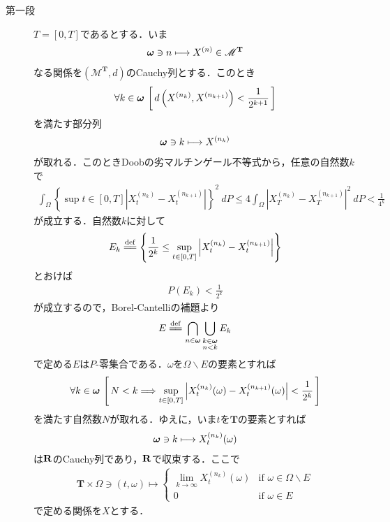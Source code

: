 	\begin{sketch}\mbox{}
		\begin{description}
			\item[第一段] $T = [0,T]$であるとする．いま
				\begin{align}
					{\boldsymbol \omega} \ni n \longmapsto X^{(n)} \in \mathscr{M}^{\mathbf{T}}
				\end{align}
				なる関係を$\left(\mathscr{M}^{\mathbf{T}},d\right)$のCauchy列とする．このとき
				\begin{align}
					\forall k \in {\boldsymbol \omega}\, \left[\, d\left( X^{(n_k)},X^{(n_{k+1})} \right) < \frac{1}{2^{k+1}}\, \right]
				\end{align}
				を満たす部分列
				\begin{align}
					{\boldsymbol \omega} \ni k \longmapsto X^{(n_k)}
				\end{align}
				が取れる．このときDoobの劣マルチンゲール不等式から，任意の自然数$k$で
				\begin{align}
					\int_\Omega \left\{ \sup{t \in [0,T]}{\left|X_t^{(n_k)} - X_t^{(n_{k+1})}\right|} \right\}^2\ dP
					\leq 4 \int_\Omega \left|X_T^{(n_k)} - X_T^{(n_{k+1})}\right|^2\ dP
					< \frac{1}{4^k}
					\label{fom:thm_pseudo_metric_on_square_integrable_martingales_2}
				\end{align}
				が成立する．自然数$k$に対して
				\begin{align}
					E_k \defeq \left\{ \frac{1}{2^k} \leq \sup{t \in [0,T]}{\left|X_t^{(n_k)} - X_t^{(n_{k+1})}\right|} \right\}
				\end{align}
				とおけば
				\begin{align}
					P(E_k) < \frac{1}{2^k}
				\end{align}
				が成立するので，Borel-Cantelliの補題より
				\begin{align}
					E \defeq \bigcap_{n \in \Natural} \bigcup_{\substack{k \in \Natural \\ n < k}} E_k
				\end{align}
				で定める$E$は$P$-零集合である．$\omega$を$\Omega \backslash E$の要素とすれば
				\begin{align}
					\forall k \in {\boldsymbol \omega}\,
					\left[\, N < k \Longrightarrow \operatorname*{sup}_{t \in [0,T]} \left|X_t^{(n_k)}(\omega) - X_t^{(n_{k+1})}(\omega)\right| < \frac{1}{2^k}\, \right]
					\label{fom:thm_pseudo_metric_on_square_integrable_martingales_1}
				\end{align}
				を満たす自然数$N$が取れる．ゆえに，いま$t$を$\mathbf{T}$の要素とすれば
				\begin{align}
					{\boldsymbol \omega} \ni k \longmapsto X_t^{(n_k)}(\omega)
				\end{align}
				は$\mathbf{R}$のCauchy列であり，$\mathbf{R}$で収束する．ここで
				\begin{align}
					\mathbf{T} \times \Omega \ni (t,\omega) \longmapsto
					\begin{cases}
						\lim_{k \to \infty} X_t^{(n_k)}(\omega) & \mbox{if } \omega \in \Omega \backslash E \\
						0 & \mbox{if } \omega \in E
					\end{cases} 
				\end{align}
				で定める関係を$X$とする．
				

\end{description}
\end{sketch}
